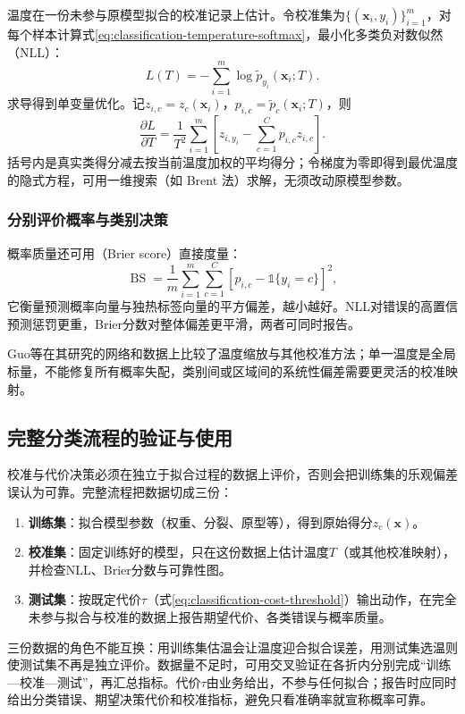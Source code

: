 温度在一份未参与原模型拟合的校准记录上估计。令校准集为$\{(\bm x_i,y_i)\}_{i=1}^{m}$，对每个样本计算式\eqref{eq:classification-temperature-softmax}，最小化多类负对数似然（NLL）：
\begin{equation}
  L(T)=-\sum_{i=1}^{m}\log\tilde p_{y_i}(\bm x_i;T).
  \label{eq:classification-temperature-nll}
\end{equation}
求导得到单变量优化。记$z_{i,c}=z_c(\bm x_i)$，$p_{i,c}=\tilde p_c(\bm x_i;T)$，则
\begin{equation}
  \frac{\partial L}{\partial T}
  =\frac{1}{T^2}\sum_{i=1}^{m}
    \left[z_{i,y_i}-\sum_{c=1}^{C}p_{i,c}z_{i,c}\right].
  \label{eq:classification-temperature-derivative}
\end{equation}
括号内是真实类得分减去按当前温度加权的平均得分；令梯度为零即得到最优温度的隐式方程，可用一维搜索（如 Brent 法）求解，无须改动原模型参数。

\subsubsection{分别评价概率与类别决策}
概率质量还可用（Brier score）直接度量：
\begin{equation}
  \operatorname{BS}
  =\frac{1}{m}\sum_{i=1}^{m}
    \sum_{c=1}^{C}
      [p_{i,c}-\mathbb 1\{y_i=c\}]^2,
  \label{eq:classification-brier}
\end{equation}
它衡量预测概率向量与独热标签向量的平方偏差，越小越好。NLL对错误的高置信预测惩罚更重，Brier分数对整体偏差更平滑，两者可同时报告。

Guo等在其研究的网络和数据上比较了温度缩放与其他校准方法；单一温度是全局标量，不能修复所有概率失配，类别间或区域间的系统性偏差需要更灵活的校准映射。

\subsection{完整分类流程的验证与使用}
\label{sec:classification-pipeline}

校准与代价决策必须在独立于拟合过程的数据上评价，否则会把训练集的乐观偏差误认为可靠。完整流程把数据切成三份：

\begin{enumerate}
  \item \textbf{训练集}：拟合模型参数（权重、分裂、原型等），得到原始得分$z_c(\bm x)$。
  \item \textbf{校准集}：固定训练好的模型，只在这份数据上估计温度$T$（或其他校准映射），并检查NLL、Brier分数与可靠性图。
  \item \textbf{测试集}：按既定代价$\tau$（式\eqref{eq:classification-cost-threshold}）输出动作，在完全未参与拟合与校准的数据上报告期望代价、各类错误与概率质量。
\end{enumerate}

三份数据的角色不能互换：用训练集估温会让温度迎合拟合误差，用测试集选温则使测试集不再是独立评价。数据量不足时，可用交叉验证在各折内分别完成“训练—校准—测试”，再汇总指标。代价$\tau$由业务给出，不参与任何拟合；报告时应同时给出分类错误、期望决策代价和校准指标，避免只看准确率就宣称概率可靠。
